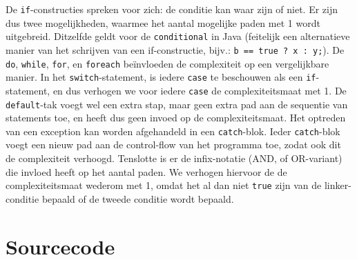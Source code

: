 \documentclass[a4paper]{article}
\begin{document}
De \texttt{if}-constructies spreken voor zich: de conditie kan waar zijn of niet. Er zijn dus twee mogelijkheden, waarmee het aantal mogelijke paden met 1 wordt uitgebreid. Ditzelfde geldt voor de \texttt{conditional} in Java (feitelijk een alternatieve manier van  het schrijven van een if-constructie, bijv.: \texttt{b == true ? x : y;}). De \texttt{do}, \texttt{while}, \texttt{for}, en \texttt{foreach} be\"invloeden de complexiteit op een vergelijkbare manier. In het \texttt{switch}-statement, is iedere \texttt{case} te beschouwen als een \texttt{if}-statement, en dus verhogen we voor iedere \texttt{case} de complexiteitsmaat met 1. 
De \texttt{default}-tak voegt wel een extra stap, maar geen extra pad aan de sequentie van statements toe, en heeft dus geen invoed op de complexiteitsmaat.
Het optreden van een exception kan worden afgehandeld in een \texttt{catch}-blok. Ieder \texttt{catch}-blok voegt een nieuw pad aan de control-flow van het programma toe, zodat ook dit de complexiteit verhoogd.
Tenslotte is er de infix-notatie (AND, of OR-variant) die invloed heeft op het aantal paden. We verhogen hiervoor de de complexiteitsmaat wederom met 1, omdat het al dan niet \texttt{true} zijn van de linker-conditie bepaald of de tweede conditie wordt bepaald.


\section{Sourcecode}
\end{document}
